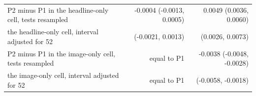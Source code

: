 \begin{tabular}{p{7.4cm}rr}
P2 minus P1 in the headline-only cell, tests resampled & -0.0004 (-0.0013, 0.0005) & 0.0049 (0.0036, 0.0060) \\
\quad the headline-only cell, interval adjusted for 52 & (-0.0021, 0.0013) & (0.0026, 0.0073) \\
P2 minus P1 in the image-only cell, tests resampled & equal to P1 & -0.0038 (-0.0048, -0.0028) \\
\quad the image-only cell, interval adjusted for 52 & equal to P1 & (-0.0058, -0.0018) \\

\end{tabular}
